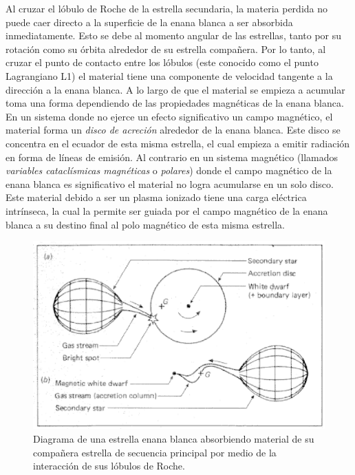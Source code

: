 Al cruzar el lóbulo de Roche de la estrella secundaria, la materia perdida no puede caer directo a la superficie de la enana blanca a ser absorbida inmediatamente. Esto se debe al momento angular de las estrellas, tanto por su rotación como su órbita alrededor de su estrella compañera. Por lo tanto, al cruzar el punto de contacto entre los lóbulos (este conocido como el punto Lagrangiano L1) el material tiene una componente de velocidad tangente a la dirección a la enana blanca. A lo largo de que el material se empieza a acumular toma una forma dependiendo de las propiedades magnéticas de la enana blanca. En un sistema donde no ejerce un efecto significativo un campo magnético, el material forma un \textit{disco de acreción} alrededor de la enana blanca. Este disco se concentra en el ecuador de esta misma estrella, el cual empieza a emitir radiación en forma de líneas de emisión. Al contrario en un sistema magnético (llamados \textit{variables cataclísmicas magnéticas} o \textit{polares}) donde el campo magnético de la enana blanca es significativo el material no logra acumularse en un solo disco. Este material debido a ser un plasma ionizado tiene una carga eléctrica intrínseca, la cual la permite ser guiada por el campo magnético de la enana blanca a su destino final al polo magnético de esta misma estrella. 
\\\newline
\begin{figure}
	\begin{center}
		\includegraphics[scale=0.4]{Introduccion/Figures/Figura Acrecion_SmithReview.png}
	\end{center}

	\begin{center}
		\caption{Diagrama de una estrella enana blanca absorbiendo material de su compañera estrella de secuencia principal por medio de la interacción de sus lóbulos de Roche.}
	\end{center}
	\label{acrecion_smith_review}
\end{figure}
